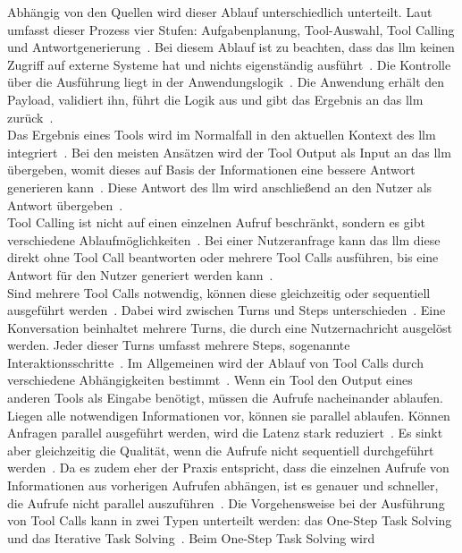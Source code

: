 Abhängig von den Quellen wird dieser Ablauf unterschiedlich unterteilt. Laut~\textcite{tc10} umfasst dieser Prozess vier Stufen: Aufgabenplanung, 
Tool-Auswahl, Tool Calling und Antwortgenerierung~\cite[8]{tc10}. Bei diesem Ablauf ist zu beachten, dass das \ac{llm} keinen Zugriff auf externe Systeme hat und 
nichts eigenständig ausführt~\cite{tc03}. Die Kontrolle über die Ausführung liegt in der Anwendungslogik~\cite{tc07}. Die Anwendung erhält den Payload, validiert ihn, führt
die Logik aus und gibt das Ergebnis an das \ac{llm} zurück~\cite{tc03}. \\
Das Ergebnis eines Tools wird im Normalfall in den aktuellen Kontext des \ac{llm} integriert~\cite[3]{tc09}. Bei den meisten Ansätzen wird der Tool Output als 
Input an das \ac{llm} übergeben, womit dieses auf Basis der Informationen eine bessere Antwort generieren kann~\cite[17]{tc10}. Diese Antwort des 
\ac{llm} wird anschließend an den Nutzer als Antwort übergeben~\cite{tc05}. \\
Tool Calling ist nicht auf einen einzelnen Aufruf beschränkt, sondern es gibt verschiedene Ablaufmöglichkeiten~\cite{tc01}. Bei einer Nutzeranfrage kann das \ac{llm}
diese direkt ohne Tool Call beantworten oder mehrere Tool Calls ausführen, bis eine Antwort für den Nutzer generiert werden kann~\cite{tc01}. \\
Sind mehrere Tool Calls notwendig, können diese gleichzeitig oder sequentiell ausgeführt werden~\cite[7]{tc14}. Dabei wird zwischen 
Turns und Steps unterschieden~\cite[4]{tc14}. Eine Konversation beinhaltet mehrere Turns, die durch eine Nutzernachricht ausgelöst werden. Jeder dieser Turns umfasst
mehrere Steps, sogenannte Interaktionsschritte~\cite[4]{tc14}. Im Allgemeinen wird der Ablauf von Tool Calls durch verschiedene Abhängigkeiten bestimmt~\cite{tc03}. 
Wenn ein Tool den Output eines anderen Tools als Eingabe benötigt, müssen die Aufrufe nacheinander ablaufen. Liegen alle notwendigen Informationen vor, können sie 
parallel ablaufen. Können Anfragen parallel ausgeführt werden, wird die Latenz stark reduziert~\cite[7]{tc14}. Es sinkt aber gleichzeitig die Qualität, wenn die 
Aufrufe nicht sequentiell durchgeführt werden~\cite[7]{tc14}. Da es zudem eher der Praxis entspricht, dass die einzelnen Aufrufe von Informationen aus vorherigen 
Aufrufen abhängen, ist es genauer und schneller, die Aufrufe nicht parallel auszuführen~\cite[7]{tc14}. Die Vorgehensweise bei der Ausführung von Tool 
Calls kann in zwei Typen unterteilt werden: das One-Step Task Solving und das Iterative Task Solving~\cite[9]{tc10}. Beim One-Step Task Solving wird
